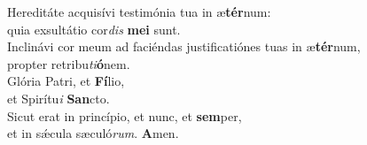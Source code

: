 \oddverse Hereditáte acquisívi testimónia tua in æ\textbf{tér}num:~\*\\
\oddverse quia exsultátio cor\textit{dis} \textbf{me}\textbf{i} sunt.\\
\evenverse Inclinávi cor meum ad faciéndas justificatiónes tuas in æ\textbf{tér}num,~\*\\
\evenverse propter retribu\textit{ti}\textbf{ó}nem.\\
\oddverse Glória Patri, et \textbf{Fí}lio,~\*\\
\oddverse et Spirítu\textit{i} \textbf{San}cto.\\
\evenverse Sicut erat in princípio, et nunc, et \textbf{sem}per,~\*\\
\evenverse et in sǽcula sæculó\textit{rum}. \textbf{A}men.\\
